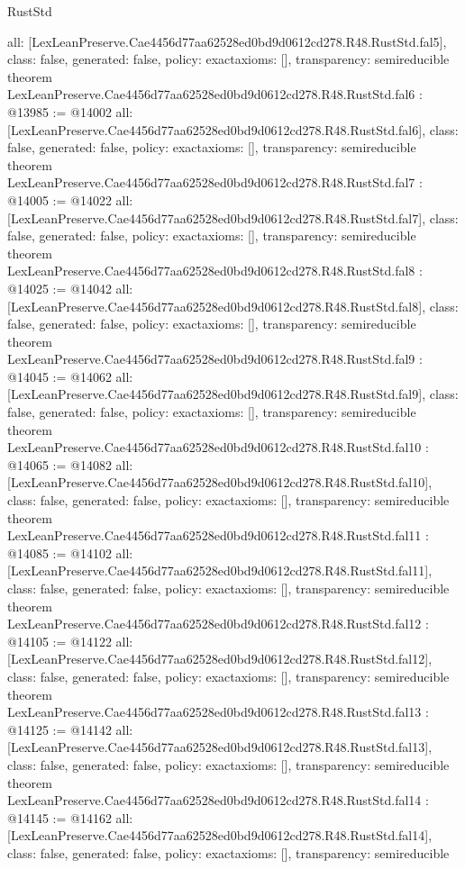 \begin{lexlean}{RustStd}
\begin{coremodule}
{  all: [LexLeanPreserve.Cae4456d77aa62528ed0bd9d0612cd278.R48.RustStd.fal5],
  class: false,
  generated: false,
  policy: exact{axioms: []},
  transparency: semireducible
}
theorem LexLeanPreserve.Cae4456d77aa62528ed0bd9d0612cd278.R48.RustStd.fal6 : @13985 := @14002 {
  all: [LexLeanPreserve.Cae4456d77aa62528ed0bd9d0612cd278.R48.RustStd.fal6],
  class: false,
  generated: false,
  policy: exact{axioms: []},
  transparency: semireducible
}
theorem LexLeanPreserve.Cae4456d77aa62528ed0bd9d0612cd278.R48.RustStd.fal7 : @14005 := @14022 {
  all: [LexLeanPreserve.Cae4456d77aa62528ed0bd9d0612cd278.R48.RustStd.fal7],
  class: false,
  generated: false,
  policy: exact{axioms: []},
  transparency: semireducible
}
theorem LexLeanPreserve.Cae4456d77aa62528ed0bd9d0612cd278.R48.RustStd.fal8 : @14025 := @14042 {
  all: [LexLeanPreserve.Cae4456d77aa62528ed0bd9d0612cd278.R48.RustStd.fal8],
  class: false,
  generated: false,
  policy: exact{axioms: []},
  transparency: semireducible
}
theorem LexLeanPreserve.Cae4456d77aa62528ed0bd9d0612cd278.R48.RustStd.fal9 : @14045 := @14062 {
  all: [LexLeanPreserve.Cae4456d77aa62528ed0bd9d0612cd278.R48.RustStd.fal9],
  class: false,
  generated: false,
  policy: exact{axioms: []},
  transparency: semireducible
}
theorem LexLeanPreserve.Cae4456d77aa62528ed0bd9d0612cd278.R48.RustStd.fal10 : @14065 := @14082 {
  all: [LexLeanPreserve.Cae4456d77aa62528ed0bd9d0612cd278.R48.RustStd.fal10],
  class: false,
  generated: false,
  policy: exact{axioms: []},
  transparency: semireducible
}
theorem LexLeanPreserve.Cae4456d77aa62528ed0bd9d0612cd278.R48.RustStd.fal11 : @14085 := @14102 {
  all: [LexLeanPreserve.Cae4456d77aa62528ed0bd9d0612cd278.R48.RustStd.fal11],
  class: false,
  generated: false,
  policy: exact{axioms: []},
  transparency: semireducible
}
theorem LexLeanPreserve.Cae4456d77aa62528ed0bd9d0612cd278.R48.RustStd.fal12 : @14105 := @14122 {
  all: [LexLeanPreserve.Cae4456d77aa62528ed0bd9d0612cd278.R48.RustStd.fal12],
  class: false,
  generated: false,
  policy: exact{axioms: []},
  transparency: semireducible
}
theorem LexLeanPreserve.Cae4456d77aa62528ed0bd9d0612cd278.R48.RustStd.fal13 : @14125 := @14142 {
  all: [LexLeanPreserve.Cae4456d77aa62528ed0bd9d0612cd278.R48.RustStd.fal13],
  class: false,
  generated: false,
  policy: exact{axioms: []},
  transparency: semireducible
}
theorem LexLeanPreserve.Cae4456d77aa62528ed0bd9d0612cd278.R48.RustStd.fal14 : @14145 := @14162 {
  all: [LexLeanPreserve.Cae4456d77aa62528ed0bd9d0612cd278.R48.RustStd.fal14],
  class: false,
  generated: false,
  policy: exact{axioms: []},
  transparency: semireducible
}
\end{coremodule}
\end{lexlean}
